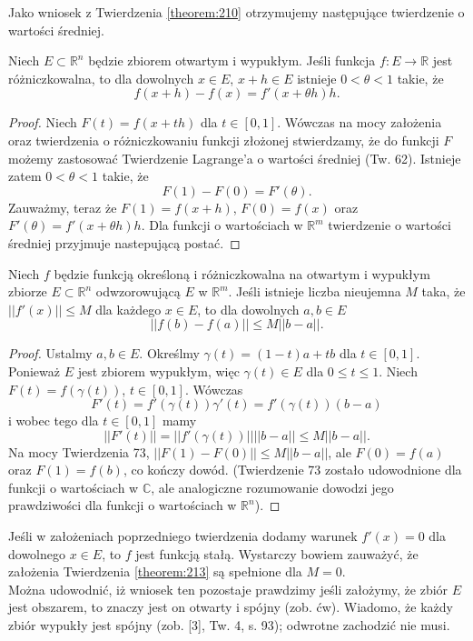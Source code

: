 \documentclass[leqno]{article}
\begin{document}
\begin{justify}
Jako wniosek z Twierdzenia \ref{theorem:210} otrzymujemy następujące twierdzenie o wartości średniej.

\begin{theorem}
{
    Niech $E \subset \mathbb{R}^n$ będzie zbiorem otwartym i wypukłym. Jeśli funkcja $f : E \to \mathbb{R}$ jest różniczkowalna, to dla dowolnych $x \in E$, $x + h \in E$ 
    istnieje $0 < \theta < 1$ takie, że 
    \[
        f(x + h) - f(x) = f'(x + \theta h)h.
    \]
}
\end{theorem}
\begin{proof}
    Niech $F(t) = f(x + th)$ dla $t \in [0,1]$. Wówczas na mocy założenia oraz twierdzenia o różniczkowaniu funkcji złożonej stwierdzamy, że do funkcji $F$ możemy 
    zastosować Twierdzenie Lagrange'a o wartości średniej (Tw. 62). Istnieje zatem $0 < \theta < 1$ takie, że 
    \[
        F(1) - F(0) = F'(\theta).
    \]
    Zauważmy, teraz że $F(1) = f(x + h)$, $F(0) = f(x)$ oraz $F'(\theta) = f'(x + \theta h)h$.
    Dla funkcji o wartościach w $\mathbb{R}^m$ twierdzenie o wartości średniej przyjmuje nastepującą postać. 
\end{proof}

\begin{theorem}
{
    Niech $f$ będzie funkcją określoną i różniczkowalna na otwartym i wypukłym zbiorze $E \subset \mathbb{R}^n$ odwzorowującą $E$ w $\mathbb{R}^m$.
    Jeśli istnieje liczba nieujemna $M$ taka, że $||f'(x)|| \leqslant M$ dla każdego $x \in E$, to dla dowolnych $a, b \in E$
    \[
        ||f(b) - f(a)|| \leqslant M||b - a||.
    \]
}
\end{theorem}

\begin{proof}
    Ustalmy $a, b \in E$. Określmy $\gamma(t) = (1 - t)a + tb$ dla $t \in [0, 1]$. Ponieważ $E$ jest zbiorem wypukłym, więc $\gamma(t) \in E$ dla $0 \leqslant t \leqslant 1$.
    Niech $F(t) = f(\gamma(t))$, $t \in [0,1]$. Wówczas 
    \[
        F'(t) = f'(\gamma(t))\gamma'(t) = f'(\gamma(t))(b - a)
    \]
    i wobec tego dla $t \in [0,1]$ mamy
    \[
        ||F'(t)|| = ||f'(\gamma(t))||||b-a|| \leqslant M ||b-a||.
    \]
    Na mocy Twierdzenia 73, $||F(1) - F(0)|| \leqslant M||b - a||$, ale $F(0) = f(a)$ oraz $F(1) = f(b)$, co kończy dowód.
    (Twierdzenie 73 zostało udowodnione dla funkcji o wartościach w $\mathbb{C}$, ale analogiczne rozumowanie dowodzi jego prawdziwości dla funkcji o wartościach w $\mathbb{R}^n$).
\end{proof}

\begin{wniosek}
{
    Jeśli w założeniach poprzedniego twierdzenia dodamy warunek $f'(x) = 0$ dla dowolnego $x \in E$, to $f$ jest funkcją stałą. Wystarczy bowiem zauważyć, że 
    założenia Twierdzenia \ref{theorem:213} są spełnione dla $M = 0$. \\
    Można udowodnić, iż wniosek ten pozostaje prawdzimy jeśli założymy, że zbiór $E$ jest obszarem, to znaczy jest on otwarty i spójny (zob. ćw).
    Wiadomo, że każdy zbiór wypukły jest spójny (zob. [3], Tw. 4, s. 93); odwrotne zachodzić nie musi.
}    
\end{wniosek}


\end{justify}
\end{document}
